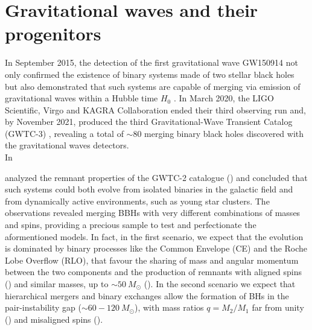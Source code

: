 \documentclass[a4paper,titlepage]{book}     	%
\newcommand{\sun}{\ensuremath{_\odot}}
\newcommand{\msun}{\ensuremath{M\sun}}
\begin{document}
\chapter{Gravitational waves and their progenitors}
In September 2015, the detection of the first gravitational wave GW150914 not only confirmed the existence of binary systems made of two stellar black holes but also demonstrated that such systems are capable of merging via emission of gravitational waves within a Hubble time $H_0$ \cite{Abbott2016firstGW}. In March 2020, the LIGO Scientific, Virgo and KAGRA Collaboration ended their third observing run and, by November 2021, produced the third Gravitational-Wave Transient Catalog (GWTC-3) \cite{GWTC-3}, revealing a total of $\sim 80$ merging binary black holes discovered with the gravitational waves detectors.\\


In \cite{GWTC-3_interpretation}




\cite{Abbot2021spectrumGW,HMXBH_spins2021} analyzed the remnant properties of the GWTC-2 catalogue (\cite{GWTC-2}) and concluded that such systems could both evolve from isolated binaries in the galactic field and from dynamically active environments, such as young star clusters. The observations revealed merging BBHs with very different combinations of masses and spins, providing a precious sample to test and perfectionate the aformentioned models. In fact, in the first scenario, we expect that the evolution is dominated by binary processes like the Common Envelope (CE) and the Roche Lobe Overflow (RLO), that favour the sharing of mass and angular momentum between the two components and the production of remnants with aligned spins (\cite{Kalogera2000_spinaligned}) and similar masses, up to $\sim 50~\msun$ (\cite{Giacobbo2018spectrum}). In the second scenario we expect that hierarchical mergers and binary exchanges allow the formation of BHs in the pair-instability gap ($\sim 60-120~\msun$), with mass ratios $q=M_2/M_1$ far from unity (\cite{Rastello2021_dynamics}) and misaligned spins (\cite{Rodriguez2016_BHspins}).
\end{document}
